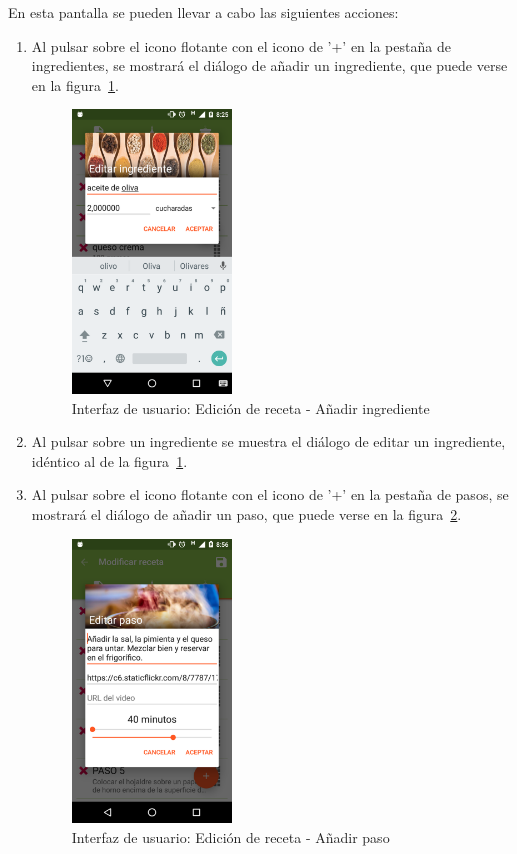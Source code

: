 En esta pantalla se pueden llevar a cabo las siguientes acciones:
\begin{enumerate}
\item Al pulsar sobre el icono flotante con el icono de '+' en la pestaña de
  ingredientes, se mostrará el diálogo de añadir un ingrediente, que puede verse
  en la figura~\ref{fig:captura_23}.
  
  \begin{figure}[htbp]
    \centering
    \includegraphics[width=0.4\textwidth]{cap5/img/captura_23}
    \caption{Interfaz de usuario: Edición de receta - Añadir ingrediente}
    \label{fig:captura_23}
  \end{figure}

\item Al pulsar sobre un ingrediente se muestra el diálogo de editar un
  ingrediente, idéntico al de la figura~\ref{fig:captura_23}.
  
\item Al pulsar sobre el icono flotante con el icono de '+' en la pestaña de
  pasos, se mostrará el diálogo de añadir un paso, que puede verse
  en la figura~\ref{fig:captura_25}.
  
  \begin{figure}[htbp]
    \centering
    \includegraphics[width=0.4\textwidth]{cap5/img/captura_25}
    \caption{Interfaz de usuario: Edición de receta - Añadir paso}
    \label{fig:captura_25}
  \end{figure}



\end{enumerate}

